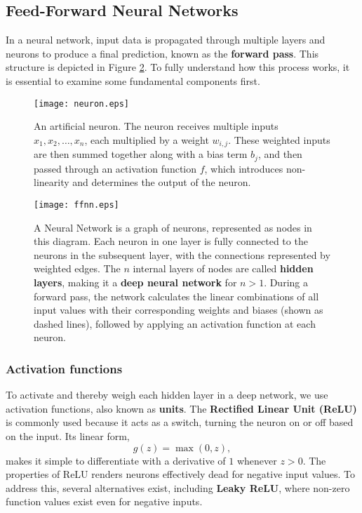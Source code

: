 \documentclass{article}
\begin{document}
\begin{multicols}{2}
\section*{Feed-Forward Neural Networks}
In a neural network, input data is propagated through multiple layers and neurons to produce a final prediction, known as the \textbf{forward pass}. This structure is depicted in Figure \ref{fig:ffnn_fig}. To fully understand how this process works, it is essential to examine some fundamental components first.
\begin{figure}[H]
    \centering
    \texttt{[image: neuron.eps]} 
    \caption{An artificial neuron. The neuron receives multiple inputs $x_1, x_2, \dots, x_n$, each multiplied by a weight $w_{i, j}$. These weighted inputs are then summed together along with a bias term $b_j$, and then passed through an activation function $f$, which introduces non-linearity and determines the output of the neuron.} 
    \label{fig:neuron_fig}
\end{figure}
\begin{figure}[H]
    \centering
    \texttt{[image: ffnn.eps]} 
    \caption{A Neural Network is a graph of neurons, represented as nodes in this diagram. Each neuron in one layer is fully connected to the neurons in the subsequent layer, with the connections represented by weighted edges. The $n$ internal layers of nodes are called \textbf{hidden layers}, making it a \textbf{deep neural network} for $n > 1$. During a forward pass, the network calculates the linear combinations of all input values with their corresponding weights and biases (shown as dashed lines), followed by applying an activation function at each neuron. \cite{perrotta_programming_2020}} 
    \label{fig:ffnn_fig}
\end{figure}

\subsubsection*{Activation functions} To activate and thereby weigh each hidden layer in a deep network, we use activation functions, also known as \textbf{units}. The \textbf{Rectified Linear Unit (ReLU)} is commonly used because it acts as a switch, turning the neuron on or off based on the input. Its linear form,
\begin{equation*}
g(z) = \max(0, z),
\end{equation*}
makes it simple to differentiate with a derivative of $1$ whenever $z > 0$. The properties of ReLU renders neurons effectively dead for negative input values. To address this, several alternatives exist, including \textbf{Leaky ReLU}, where non-zero function values exist even for negative inputs. 


\end{multicols}
\end{document}
